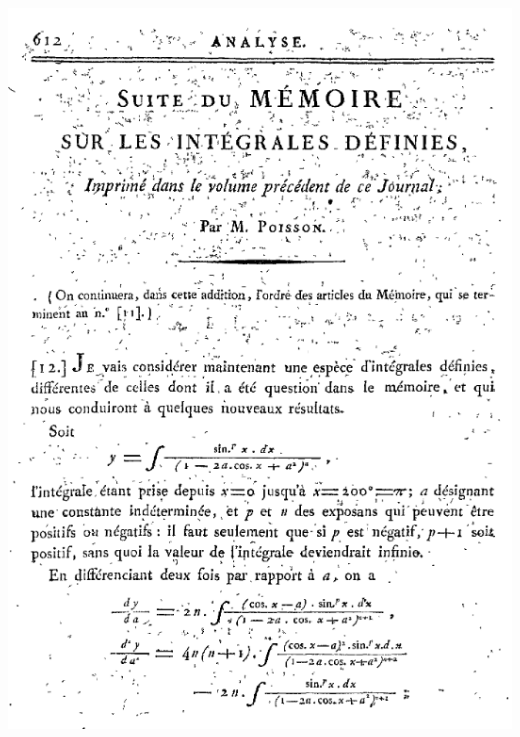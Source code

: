 \begin{marginfigure}[-5cm]
    \centering
    \includegraphics[scale=0.08]{illustrations/Journal_de_l_ecole_polytechnique_cahier_17_1815.png}
\end{marginfigure}
